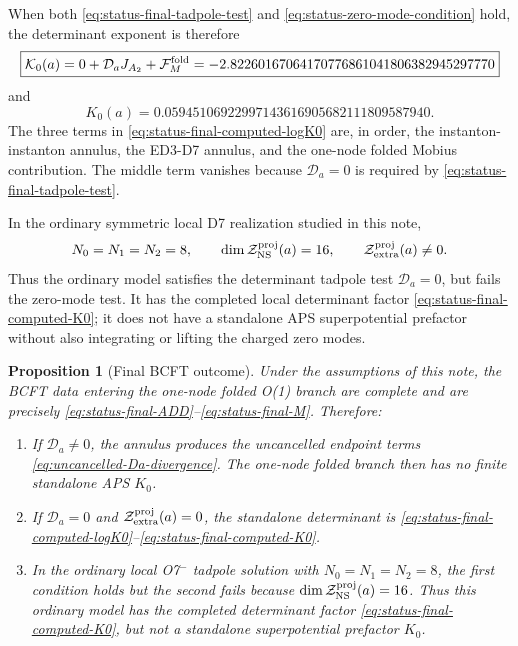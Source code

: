 \documentclass[11pt]{article}
\newcommand{\NS}{\mathrm{NS}}
\newtheorem{proposition}{Proposition}
\begin{document}
When both \eqref{eq:status-final-tadpole-test} and \eqref{eq:status-zero-mode-condition} hold,
the determinant exponent is therefore
\begin{equation}
  \boxed{
  \mathcal K_0(a)
  =
  0
  +
  \mathcal D_aJ_{A_2}
  +
  \mathcal F_M^{\rm fold}
  =
  -2.82260167064170776861041806382945297770
  }
  \label{eq:status-final-computed-logK0}
\end{equation}
and
\begin{equation}
  \boxed{
  K_0(a)
  =
  0.05945106922997143616905682111809587940 .
  }
  \label{eq:status-final-computed-K0}
\end{equation}
The three terms in \eqref{eq:status-final-computed-logK0} are, in order, the instanton-instanton
annulus, the ED3-D7 annulus, and the one-node folded Mobius contribution.  The middle term
vanishes because \(\mathcal D_a=0\) is required by \eqref{eq:status-final-tadpole-test}.

In the ordinary symmetric local D7 realization studied in this note,
\begin{equation}
  N_0=N_1=N_2=8,
  \qquad
  \dim\mathcal Z_{\NS}^{\rm proj}(a)=16,
  \qquad
  \mathcal Z_{\rm extra}^{\rm proj}(a)\ne0 .
  \label{eq:status-symmetric-zero-mode-obstruction}
\end{equation}
Thus the ordinary model satisfies the determinant tadpole test \(\mathcal D_a=0\), but fails
the zero-mode test.  It has the completed local determinant factor
\eqref{eq:status-final-computed-K0}; it does not have a standalone APS superpotential
prefactor without also integrating or lifting the charged zero modes.

\begin{proposition}[Final BCFT outcome]
\label{prop:final-bcft-outcome}
Under the assumptions of this note, the BCFT data entering the one-node folded O(1) branch are
complete and are precisely \eqref{eq:status-final-ADD}--\eqref{eq:status-final-M}. Therefore:
\begin{enumerate}
\item If \(\mathcal D_a\ne0\), the annulus produces the uncancelled endpoint terms
\eqref{eq:uncancelled-Da-divergence}. The one-node folded branch then has no finite standalone
APS \(K_0\).
\item If \(\mathcal D_a=0\) and
\(\mathcal Z_{\rm extra}^{\rm proj}(a)=0\), the standalone determinant is
\eqref{eq:status-final-computed-logK0}--\eqref{eq:status-final-computed-K0}.
\item In the ordinary local O7$^-$ tadpole solution with \(N_0=N_1=N_2=8\), the first condition
holds but the second fails because \(\dim\mathcal Z_{\NS}^{\rm proj}(a)=16\). Thus this ordinary
model has the completed determinant factor \eqref{eq:status-final-computed-K0}, but not a
standalone superpotential prefactor \(K_0\).
\end{enumerate}
\end{proposition}
\end{document}
